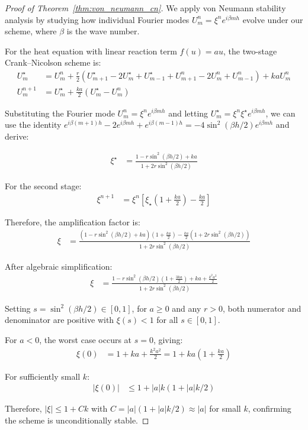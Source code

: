 \begin{proof}[Proof of Theorem~\ref{thm:von_neumann_cn}]
  We apply von Neumann stability analysis by studying how individual Fourier modes $U_m^n = \xi^n e^{i\beta mh}$ evolve under our scheme, where $\beta$ is the wave number.

  For the heat equation with linear reaction term $f(u) = au$, the two-stage Crank--Nicolson scheme is:
  \begin{align*}
    U_m^\star & = U_m^n + \frac{r}{2}\left(U_{m+1}^\star - 2U_m^\star + U_{m-1}^\star + U_{m+1}^n - 2U_m^n + U_{m-1}^n\right) + kaU_m^n \\
    U_m^{n+1} & = U_m^\star + \frac{ka}{2}(U_m^\star - U_m^n)
  \end{align*}

  Substituting the Fourier mode $U_m^n = \xi^n e^{i\beta mh}$ and letting $U_m^\star = \xi^n \xi^\star e^{i\beta mh}$, we can use the identity $e^{i\beta (m+1)h} - 2e^{i\beta mh} + e^{i\beta (m-1)h} = -4\sin^2(\beta h/2)e^{i\beta mh}$ and derive:

  \begin{align*}
    \xi^\star & = \frac{1 - r\sin^2(\beta h/2) + ka}{1 + 2r\sin^2(\beta h/2)}
  \end{align*}

  For the second stage:
  \begin{align*}
    \xi^{n+1} & = \xi^n\left[\xi_\star\left(1 + \frac{ka}{2}\right) - \frac{ka}{2}\right]
  \end{align*}

  Therefore, the amplification factor is:
  \begin{align*}
    \xi & = \frac{\left(1 - r\sin^2(\beta h/2) + ka\right)\left(1 + \frac{ka}{2}\right) - \frac{ka}{2}\left(1 + 2r\sin^2(\beta h/2)\right)}{1 + 2r\sin^2(\beta h/2)}
  \end{align*}

  After algebraic simplification:
  \begin{align*}
    \xi & = \frac{1 - r\sin^2(\beta h/2)(1 + \frac{3ka}{2}) + ka + \frac{k^2a^2}{2}}{1 + 2r\sin^2(\beta h/2)}
  \end{align*}

  Setting $s = \sin^2(\beta h/2) \in [0,1]$, for $a \geq 0$ and any $r > 0$, both numerator and denominator are positive with $\xi(s) < 1$ for all $s \in [0,1]$.

  \medskip

  For $a < 0$, the worst case occurs at $s = 0$, giving:
  \begin{align*}
    \xi(0) & = 1 + ka + \frac{k^2a^2}{2} = 1 + ka\left(1 + \frac{ka}{2}\right)
  \end{align*}

  For sufficiently small $k$:
  \begin{align*}
    |\xi(0)| & \leq 1 + |a|k(1 + |a|k/2)
  \end{align*}

  Therefore, $|\xi| \leq 1 + Ck$ with $C = |a|(1 + |a|k/2) \approx |a|$ for small $k$, confirming the scheme is unconditionally stable.
\end{proof}


